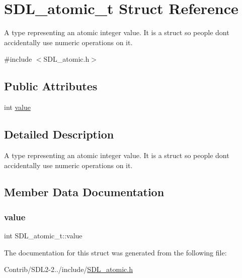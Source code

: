 \hypertarget{struct_s_d_l__atomic__t}{}\section{S\+D\+L\+\_\+atomic\+\_\+t Struct Reference}
\label{struct_s_d_l__atomic__t}


A type representing an atomic integer value. It is a struct so people don\textquotesingle{}t accidentally use numeric operations on it.  




{\ttfamily \#include $<$S\+D\+L\+\_\+atomic.\+h$>$}

\subsection*{Public Attributes}
\begin{DoxyCompactItemize}
\item 
int \mbox{\hyperlink{struct_s_d_l__atomic__t_a0d09ddf3cc5798c709edb7cea104203a}{value}}
\end{DoxyCompactItemize}


\subsection{Detailed Description}
A type representing an atomic integer value. It is a struct so people don\textquotesingle{}t accidentally use numeric operations on it. 

\subsection{Member Data Documentation}
\mbox{\label{struct_s_d_l__atomic__t_a0d09ddf3cc5798c709edb7cea104203a}} 
\subsubsection{\texorpdfstring{value}{value}}
{\footnotesize\ttfamily int S\+D\+L\+\_\+atomic\+\_\+t\+::value}



The documentation for this struct was generated from the following file\+:\begin{DoxyCompactItemize}
\item 
Contrib/\+S\+D\+L2-\/2../include/\mbox{\hyperlink{_s_d_l__atomic_8h}{S\+D\+L\+\_\+atomic.\+h}}\end{DoxyCompactItemize}
